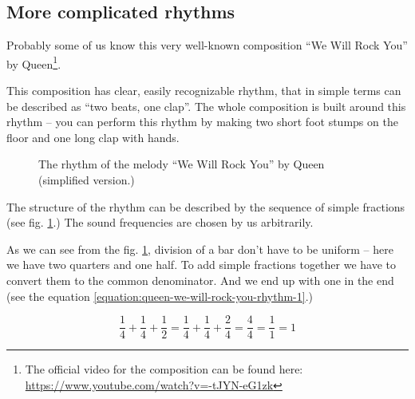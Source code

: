 \documentclass[../sparc.tex]{subfiles}
\begin{document}
\subsection{More complicated rhythms}

Probably some of us know this very well-known composition ``We Will Rock You''
by Queen\footnote{The official video for the composition can be found here:
\url{https://www.youtube.com/watch?v=-tJYN-eG1zk}}.

This composition has clear, easily recognizable rhythm, that in simple terms can
be described as ``two beats, one clap''.  The whole composition is built around
this rhythm -- you can perform this rhythm by making two short foot stumps on the
floor and one long clap with hands.

\begin{figure}[ht]
  \centering
  \caption{The rhythm of the melody ``We Will Rock You'' by Queen (simplified
    version.)}
  \label{fig:queen-we-will-rock-you-rhythm-1}
\end{figure}

The structure of the rhythm can be described by the sequence of simple fractions
(see fig. \ref{fig:queen-we-will-rock-you-rhythm-1}.)  The sound frequencies are
chosen by us arbitrarily.

As we can see from the fig. \ref{fig:queen-we-will-rock-you-rhythm-1}, division
of a bar don't have to be uniform -- here we have two quarters and one half.  To
add simple fractions together we have to convert them to the common denominator.
And we end up with one in the end (see the equation
\ref{equation:queen-we-will-rock-you-rhythm-1}.)

\begin{equation}
  \frac{1}{4} + \frac{1}{4} + \frac{1}{2} = \frac{1}{4} + \frac{1}{4} + \frac{2}{4} = \frac{4}{4} = \frac{1}{1} = 1
  \label{equation:queen-we-will-rock-you-rhythm-1}
\end{equation}
\end{document}
